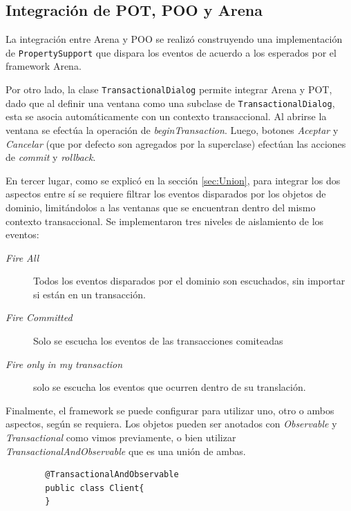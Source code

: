 \subsection{Integración de POT, POO y Arena}
La integración entre Arena y POO se realizó construyendo una implementación de
\lstinline|PropertySupport| que dispara los eventos de acuerdo a los esperados
por el framework Arena.

\medskip
Por otro lado, la clase \lstinline|TransactionalDialog| permite integrar Arena y
POT, dado que al definir una ventana como una subclase de
\lstinline|TransactionalDialog|, esta se asocia automáticamente con un
contexto transaccional.
Al abrirse la ventana se efectúa la operación de \emph{beginTransaction}.
Luego, botones \emph{Aceptar} y \emph{Cancelar} (que por defecto son agregados
por la superclase) efectúan las acciones de \emph{commit} y
\emph{rollback}.

\medskip
En tercer lugar, como se explicó en la sección \ref{sec:Union}, para integrar
los dos aspectos entre sí se requiere filtrar los eventos disparados por los objetos de dominio, 
limitándolos a las ventanas que se encuentran dentro del mismo contexto
transaccional. 
Se implementaron tres niveles de aislamiento de los eventos:
\begin{description}
	\item[\emph{Fire All}] Todos los eventos disparados por el dominio son
	escuchados, sin importar si están en un transacción.

	\item[\emph{Fire Committed}] Solo se escucha los eventos de las transacciones
		comiteadas
	
	\item[\emph{Fire only in my transaction}] solo se escucha los eventos que
		ocurren dentro de su translación.
 \end{description}
 
\medskip
Finalmente, el framework se puede configurar para utilizar uno, otro o ambos
aspectos, según se requiera.
Los objetos pueden ser anotados con \emph{Observable} y
\emph{Transactional} como vimos previamente, 
o bien utilizar \emph{TransactionalAndObservable} que es una unión de ambas.

	\begin{lstlisting} 
		@TransactionalAndObservable
		public class Client{
		}
	\end{lstlisting}

